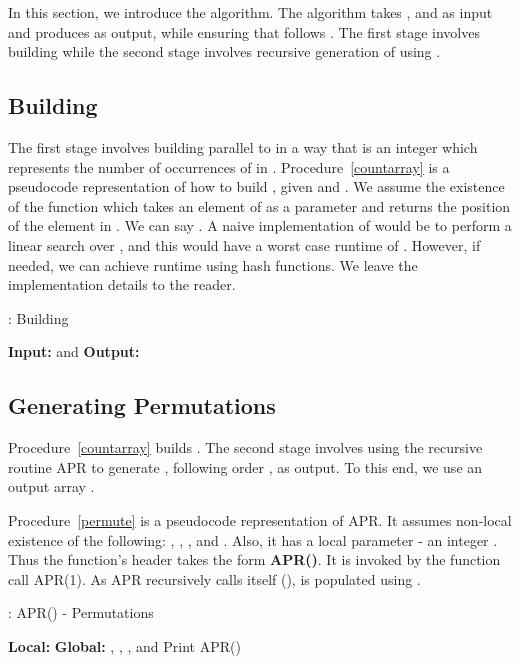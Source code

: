 \documentclass{article}
\begin{document}
In this section, we introduce the algorithm. The algorithm takes ,  and  as input and produces  as output, while ensuring that  follows . The first stage involves building  while the second stage involves recursive generation of  using .

\subsection{Building }

The first stage involves building  parallel to  in a way that  is an integer which represents the number of occurrences of  in . Procedure~\ref{countarray} is a pseudocode representation of how to build , given  and . We assume the existence of the function  which takes an element of  as a parameter and returns the position of the element in . We can say . A naive implementation of  would be to perform a linear search over , and this would have a worst case runtime of . However, if needed, we can achieve  runtime using hash functions. We leave the implementation details to the reader.

\begin{algorithm}
\caption{: Building }
\label{countarray}
\begin{algorithmic}[1]
 \STATE \textbf{Input:}  and 
 \STATE \textbf{Output:} 
 \medskip
 \STATE 
	\STATE 
	\STATE 
 \ENDFOR
\end{algorithmic}
\end{algorithm}

\subsection{Generating Permutations}

Procedure~\ref{countarray} builds . The second stage involves using the recursive routine APR to generate , following order , as output. To this end, we use an output array .

Procedure~\ref{permute} is a pseudocode representation of APR. It assumes non-local existence of the following: , , ,  and . Also, it has a local parameter - an integer . Thus the function's header takes the form \textbf{APR()}. It is invoked by the function call APR(1). As APR recursively calls itself (),  is populated using .

\begin{algorithm}
\begin{algorithmic}[1]
\caption{: APR() - Permutations}
\label{permute}
\STATE \textbf{Local:} 
\STATE \textbf{Global:} , , ,  and 
\medskip
\IF{}
	\STATE Print 
	\RETURN
\ELSE
		\IF{} \label{proc:apr:line:cond}
			\STATE  
			\STATE 
			\STATE APR()
			\STATE 
		\ENDIF
	\ENDFOR
\ENDIF
\end{algorithmic}
\end{algorithm}
\end{document}
